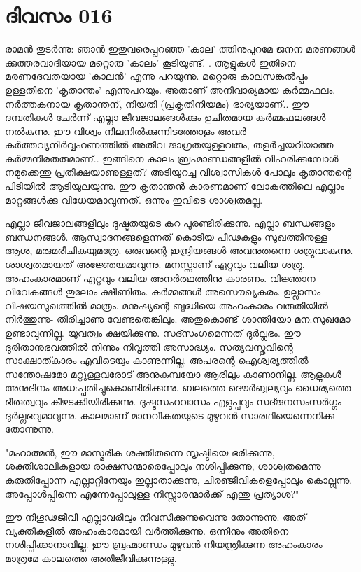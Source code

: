 \newpage
\section{ദിവസം 016}


രാമന്‍ തുടര്‍ന്നു: ഞാന്‍ ഇതുവരെപ്പറഞ്ഞ 'കാല' ത്തിനുപുറമേ ജനന മരണങ്ങള്‍ ക്കുത്തരവാദിയായ മറ്റൊരു 'കാലം' കൂടിയുണ്ട്‌. . ആളുകള്‍ ഇതിനെ മരണദേവതയായ 'കാലന്‍' എന്നു പറയുന്നു. മറ്റൊരു കാലസങ്കല്‍പ്പം ഉള്ളതിനെ 'കൃതാന്തം' എന്നുപറയും. അതാണ്‌ അനിവാര്യമായ കര്‍മ്മഫലം. നര്‍ത്തകനായ കൃതാന്തന്‌, നിയതി (പ്രകൃതിനിയമം) ഭാര്യയാണ്‌..  ഈ ദമ്പതികള്‍ ചേര്‍ന്ന് എല്ലാ ജീവജാലങ്ങള്‍ക്കും ഉചിതമായ കര്‍മ്മഫലങ്ങള്‍ നല്‍കുന്നു. ഈ വിശ്വം നിലനില്‍ക്കുന്നിടത്തോളം അവര്‍ കര്‍ത്തവ്യനിര്‍വ്വഹണത്തില്‍ അതീവ ജാഗ്രതയുള്ളവരും, തളര്‍ച്ചയറിയാത്ത കര്‍മ്മനിരതരുമാണ്‌..  ഇങ്ങിനെ കാലം ബ്രഹ്മാണ്ഡങ്ങളില്‍ വിഹരിക്കുമ്പോള്‍ നമുക്കെന്തു പ്രതീക്ഷയാണുള്ളത്‌? അടിയുറച്ച വിശ്വാസികള്‍ പോലും കൃതാന്തന്റെ പിടിയില്‍ ആടിയുലയുന്നു. ഈ  കൃതാന്തന്‍ കാരണമാണ്‌ ലോകത്തിലെ എല്ലാം മാറ്റങ്ങള്‍ക്കു വിധേയമാവുന്നത്‌. ഒന്നും ഇവിടെ ശാശ്വതമല്ല.

എല്ലാ ജീവജാലങ്ങളിലും ദുഷ്ടതയുടെ കറ പുരണ്ടിരിക്കുന്നു. എല്ലാ ബന്ധങ്ങളും ബന്ധനങ്ങള്‍.  ആസ്വാദനങ്ങളെന്നത്‌ കൊടിയ പീഢകളും സുഖത്തിനുള്ള ആശ, മരുമരീചികയുമത്രേ. ഒരുവന്റെ ഇന്ദ്രിയങ്ങള്‍ അവനുതന്നെ ശത്രുവാകുന്നു. ശാശ്വതമായത്‌ അജ്ഞേയമാവുന്നു. മനസ്സാണ്‌ ഏറ്റവും വലിയ ശത്രു. അഹംകാരമാണ്‌ ഏറ്റവും വലിയ അനര്‍ത്ഥത്തിനു കാരണം. വിജ്ഞാന വിവേകങ്ങള്‍ തുലോം ക്ഷീണിതം. കര്‍മ്മങ്ങള്‍ അസൌഖ്യകരം. ഉല്ലാസം വിഷയസുഖത്തില്‍ മാത്രം. മനുഷ്യന്റെ ബുദ്ധിയെ അഹംകാരം വരുതിയില്‍ നിര്‍ത്തുന്നു- തിരിച്ചാണു വേണ്ടതെങ്കിലും. അതുകൊണ്ട്‌ ശാന്തിയോ മന:സുഖമോ ഉണ്ടാവുന്നില്ല. യുവത്വം ക്ഷയിക്കുന്നു. സദ്സംഗമെന്നത്‌ ദുര്‍ല്ലഭം. ഈ ദുരിതാനുഭവത്തില്‍ നിന്നും നിവൃത്തി അസാദ്ധ്യം. സത്യവസ്തുവിന്റെ സാക്ഷാത്കാരം എവിടെയും കാണുന്നില്ല. അപരന്റെ ഐശ്വര്യത്തില്‍ സന്തോഷമോ മറ്റുള്ളവരോട്‌ അനുകമ്പയോ ആരിലും കാണാനില്ല. ആളുകള്‍ അനുദിനം അധ:പ്പതിച്ചുകൊണ്ടിരിക്കുന്നു. ബലത്തെ ദൌര്‍ബ്ബല്യവും ധൈര്യത്തെ ഭീരുത്വവും കീഴടക്കിയിരിക്കുന്നു. ദുഷ്ടസഹവാസം എളുപ്പവും സദ്ജനസംസര്‍ഗ്ഗം ദുര്‍ല്ലഭവുമാവുന്നു. കാലമാണ്‌ മാനവീകതയുടെ മുഴുവന്‍ സാരഥിയെന്നെനിക്കു തോന്നുന്നു. 

"മഹാത്മന്‍, ഈ മാസ്മരീക ശക്തിതന്നെ സൃഷ്ടിയെ ഭരിക്കുന്നു, ശക്തിശാലികളായ രാക്ഷസന്മാരെപ്പോലും നശിപ്പിക്കുന്നു, ശാശ്വതമെന്നു കരുതിപ്പോന്ന എല്ലാറ്റിനേയും ഇല്ലാതാക്കുന്നു, ചിരഞ്ജീവികളെപ്പോലും കൊല്ലുന്നു. അപ്പോള്‍പ്പിന്നെ എന്നേപ്പോലുള്ള നിസ്സാരന്മാര്‍ക്ക്‌ എന്തു പ്രത്യാശ?"

ഈ നിഗൂഢജീവി എല്ലാവരിലും നിവസിക്കുന്നുവെന്നു തോന്നുന്നു. അത്‌ വ്യക്തികളില്‍ അഹംകാരമായി വര്‍ത്തിക്കുന്നു. ഒന്നിനും അതിനെ നശിപ്പിക്കാനാവില്ല. ഈ ബ്രഹ്മാണ്ഡം മുഴുവന്‍ നിയന്ത്രിക്കുന്ന അഹംകാരം മാത്രമേ കാലത്തെ അതിജീവിക്കുന്നുള്ളു. 
